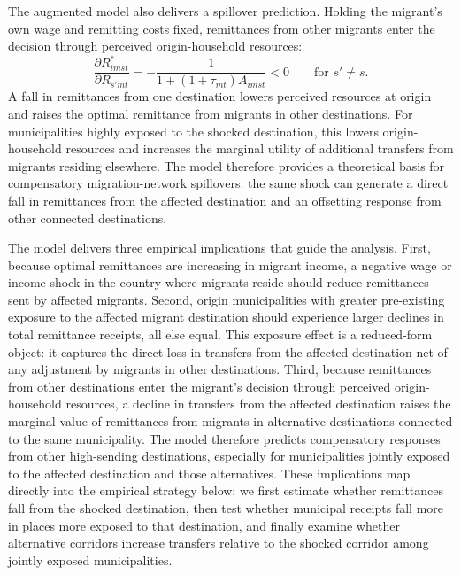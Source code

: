 The augmented model also delivers a spillover prediction. Holding the migrant's own wage and remitting costs fixed, remittances from other migrants enter the decision through perceived origin-household resources:
\begin{equation}
    \frac{\partial R^*_{imst}}{\partial R_{s'mt}}
    =
    -
    \frac{1}{1 + (1 + \tau_{mt})A_{imst}}
    <
    0
    \qquad
    \text{for } s' \neq s.
\end{equation}
A fall in remittances from one destination lowers perceived resources at origin and raises the optimal remittance from migrants in other destinations. For municipalities highly exposed to the shocked destination, this lowers origin-household resources and increases the marginal utility of additional transfers from migrants residing elsewhere. The model therefore provides a theoretical basis for compensatory migration-network spillovers: the same shock can generate a direct fall in remittances from the affected destination and an offsetting response from other connected destinations.

\par

The model delivers three empirical implications that guide the analysis. First, because optimal remittances are increasing in migrant income, a negative wage or income shock in the country where migrants reside should reduce remittances sent by affected migrants. Second, origin municipalities with greater pre-existing exposure to the affected migrant destination should experience larger declines in total remittance receipts, all else equal. This exposure effect is a reduced-form object: it captures the direct loss in transfers from the affected destination net of any adjustment by migrants in other destinations. Third, because remittances from other destinations enter the migrant's decision through perceived origin-household resources, a decline in transfers from the affected destination raises the marginal value of remittances from migrants in alternative destinations connected to the same municipality. The model therefore predicts compensatory responses from other high-sending destinations, especially for municipalities jointly exposed to the affected destination and those alternatives. These implications map directly into the empirical strategy below: we first estimate whether remittances fall from the shocked destination, then test whether municipal receipts fall more in places more exposed to that destination, and finally examine whether alternative corridors increase transfers relative to the shocked corridor among jointly exposed municipalities.

